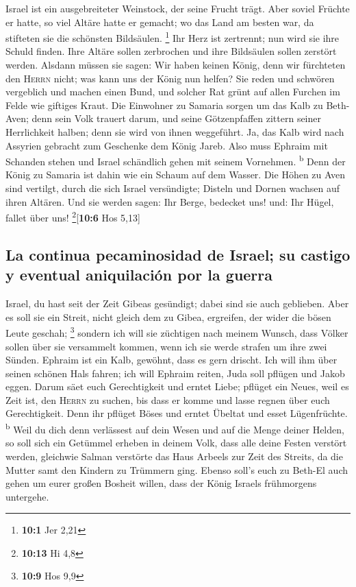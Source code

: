  Israel ist ein ausgebreiteter Weinstock, der seine Frucht
trägt. Aber soviel Früchte er hatte, so viel Altäre hatte er gemacht; wo
das Land am besten war, da stifteten sie die schönsten Bildsäulen.
\footnote{\textbf{10:1} Jer 2,21}  Ihr Herz ist zertrennt;
nun wird sie ihre Schuld finden. Ihre Altäre sollen zerbrochen und ihre
Bildsäulen sollen zerstört werden.  Alsdann müssen sie
sagen: Wir haben keinen König, denn wir fürchteten den \textsc{Herrn}
nicht; was kann uns der König nun helfen?  Sie reden und
schwören vergeblich und machen einen Bund, und solcher Rat grünt auf
allen Furchen im Felde wie giftiges Kraut.  Die Einwohner
zu Samaria sorgen um das Kalb zu Beth-Aven; denn sein Volk trauert
darum, und seine Götzenpfaffen zittern seiner Herrlichkeit halben; denn
sie wird von ihnen weggeführt.  Ja, das Kalb wird nach
Assyrien gebracht zum Geschenke dem König Jareb. Also muss Ephraim mit
Schanden stehen und Israel schändlich gehen mit seinem Vornehmen.
\textsuperscript{b}  Denn der König zu Samaria ist dahin
wie ein Schaum auf dem Wasser.  Die Höhen zu Aven sind
vertilgt, durch die sich Israel versündigte; Disteln und Dornen wachsen
auf ihren Altären. Und sie werden sagen: Ihr Berge, bedecket uns! und:
Ihr Hügel, fallet über uns! \footnote{\textbf{10:13} Hi 4,8}{[}\textbf{10:6}
Hos 5,13{]}

\hypertarget{la-continua-pecaminosidad-de-israel-su-castigo-y-eventual-aniquilaciuxf3n-por-la-guerra}{%
\subsection{La continua pecaminosidad de Israel; su castigo y eventual
aniquilación por la
guerra}\label{la-continua-pecaminosidad-de-israel-su-castigo-y-eventual-aniquilaciuxf3n-por-la-guerra}}

 Israel, du hast seit der Zeit Gibeas gesündigt; dabei
sind sie auch geblieben. Aber es soll sie ein Streit, nicht gleich dem
zu Gibea, ergreifen, der wider die bösen Leute geschah; \footnote{\textbf{10:9}
  Hos 9,9}  sondern ich will sie züchtigen nach meinem
Wunsch, dass Völker sollen über sie versammelt kommen, wenn ich sie
werde strafen um ihre zwei Sünden.  Ephraim ist ein Kalb,
gewöhnt, dass es gern drischt. Ich will ihm über seinen schönen Hals
fahren; ich will Ephraim reiten, Juda soll pflügen und Jakob eggen.
 Darum säet euch Gerechtigkeit und erntet Liebe; pflüget
ein Neues, weil es Zeit ist, den \textsc{Herrn} zu suchen, bis dass er
komme und lasse regnen über euch Gerechtigkeit.  Denn ihr
pflüget Böses und erntet Übeltat und esset Lügenfrüchte.
\textsuperscript{b}  Weil du dich denn verlässest auf
dein Wesen und auf die Menge deiner Helden, so soll sich ein Getümmel
erheben in deinem Volk, dass alle deine Festen verstört werden,
gleichwie Salman verstörte das Haus Arbeels zur Zeit des Streits, da die
Mutter samt den Kindern zu Trümmern ging.  Ebenso soll's
euch zu Beth-El auch gehen um eurer großen Bosheit willen, dass der
König Israels frühmorgens untergehe.

